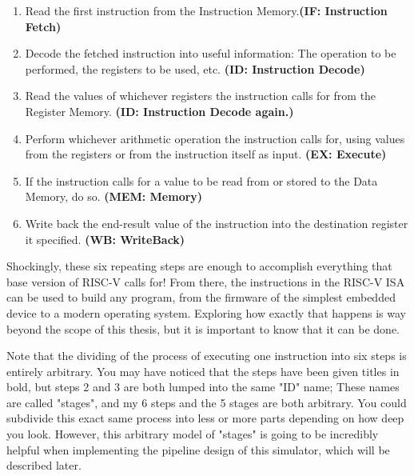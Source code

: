 \documentclass[12pt,twoside]{reedthesis}
\begin{document}
\begin{enumerate}
	\item Read the first instruction from the Instruction Memory.\textbf{(IF: Instruction Fetch)}

	\item Decode the fetched instruction into useful information: The operation to be performed, the registers to be used, etc. \textbf{(ID: Instruction Decode)}

	\item Read the values of whichever registers the instruction calls for from the Register Memory. \textbf{(ID: Instruction Decode again.)}

	\item Perform whichever arithmetic operation the instruction calls for, using values from the registers or from the instruction itself as input. \textbf{(EX: Execute)}

	\item If the instruction calls for a value to be read from or stored to the Data Memory, do so. \textbf{(MEM: Memory)}

	\item Write back the end-result value of the instruction into the destination register it specified. \textbf{(WB: WriteBack)}

\end{enumerate}

Shockingly, these six repeating steps are enough to accomplish everything that base version of RISC-V calls for!
From there, the instructions in the RISC-V ISA can be used to build any program, from the firmware of the simplest embedded device to a modern operating system. Exploring how exactly that happens is way beyond the scope of this thesis, but it is important to know that it can be done.


Note that the dividing of the process of executing one instruction into six steps is entirely arbitrary. You may have noticed that the steps have been given titles in bold, but steps 2 and 3 are both lumped into the same "ID" name; These names are called "stages", and my 6 steps and the 5 stages are both arbitrary. You could subdivide this exact same process into less or more parts depending on how deep you look.
However, this arbitrary model of "stages" is going to be incredibly helpful when implementing the pipeline design of this simulator, which will be described later.
\end{document}
